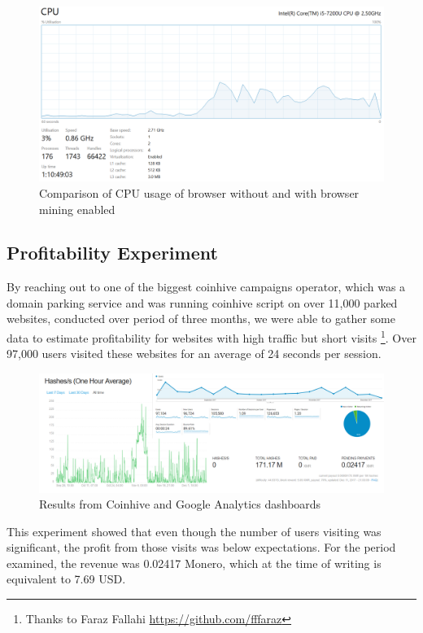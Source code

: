 \begin{figure}[t]
\centering
\includegraphics[width=\linewidth]{figures/windows_cpu_usage.png}
	\caption{Comparison of CPU usage of browser without and with browser mining enabled}
\end{figure}

\subsection{\textbf{Profitability Experiment}}
\label{profitabilitexperiment}
By reaching out to one of the biggest coinhive campaigns operator, which was a domain parking service and was running coinhive script on over 11,000 parked websites, conducted over period of three months, we were able to gather some data to estimate profitability for websites with high traffic but short visits \footnote{Thanks to Faraz Fallahi \url{https://github.com/fffaraz}}. Over 97,000 users visited these websites for an average of 24 seconds per session.

\begin{figure}[t]
\centering
\includegraphics[width=\linewidth]{figures/coinhive_experiment_11k.png}
\caption{Results from Coinhive and Google Analytics dashboards}
\end{figure}

This experiment showed that even though the number of users visiting was significant, the profit from those visits was below expectations. For the period examined, the revenue was 0.02417 Monero, which at the time of writing is equivalent to 7.69 USD.

